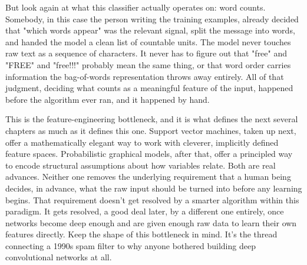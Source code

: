 But look again at what this classifier actually operates on: word counts. Somebody, in this case the person writing the training examples, already decided that "which words appear" was the relevant signal, split the message into words, and handed the model a clean list of countable units. The model never touches raw text as a sequence of characters. It never has to figure out that "free" and "FREE" and "free!!!" probably mean the same thing, or that word order carries information the bag-of-words representation throws away entirely. All of that judgment, deciding what counts as a meaningful feature of the input, happened before the algorithm ever ran, and it happened by hand.

This is the feature-engineering bottleneck, and it is what defines the next several chapters as much as it defines this one. Support vector machines, taken up next, offer a mathematically elegant way to work with cleverer, implicitly defined feature spaces. Probabilistic graphical models, after that, offer a principled way to encode structural assumptions about how variables relate. Both are real advances. Neither one removes the underlying requirement that a human being decides, in advance, what the raw input should be turned into before any learning begins. That requirement doesn't get resolved by a smarter algorithm within this paradigm. It gets resolved, a good deal later, by a different one entirely, once networks become deep enough and are given enough raw data to learn their own features directly. Keep the shape of this bottleneck in mind. It's the thread connecting a 1990s spam filter to why anyone bothered building deep convolutional networks at all.
